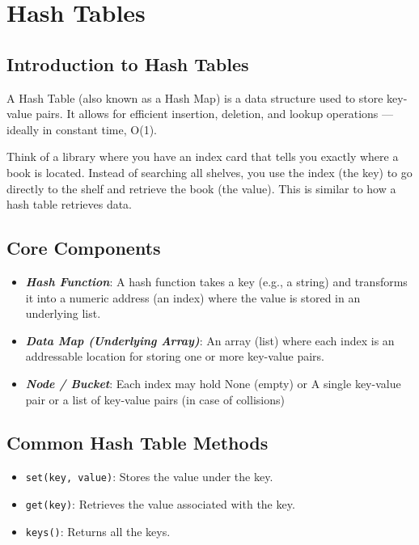 \section{Hash Tables}
\subsection{Introduction to Hash Tables}

A Hash Table (also known as a Hash Map) is a data structure used to store key-value pairs. It allows for efficient insertion, deletion, and lookup operations — ideally in constant time, O(1).

Think of a library where you have an index card that tells you exactly where a book is located. Instead of searching all shelves, you use the index (the key) to go directly to the shelf and retrieve the book (the value).
This is similar to how a hash table retrieves data.


\subsection{Core Components}
\begin{itemize}
    \item \textbf{\textit{Hash Function}}: A hash function takes a key (e.g., a string) and transforms it into a numeric address (an index) where the value is stored in an underlying list.
    \item \textbf{\textit{Data Map (Underlying Array)}}: An array (list) where each index is an addressable location for storing one or more key-value pairs.
    \item \textbf{\textit{Node / Bucket}}: Each index may hold None (empty)
    or  A single key-value pair or a list of key-value pairs (in case of collisions)
\end{itemize}

\subsection{Common Hash Table Methods}
\begin{itemize}
    \item \texttt{set(key, value)}: Stores the value under the key.
    \item \texttt{get(key)}: Retrieves the value associated with the key.
    \item \texttt{keys()}: Returns all the keys.
\end{itemize}

